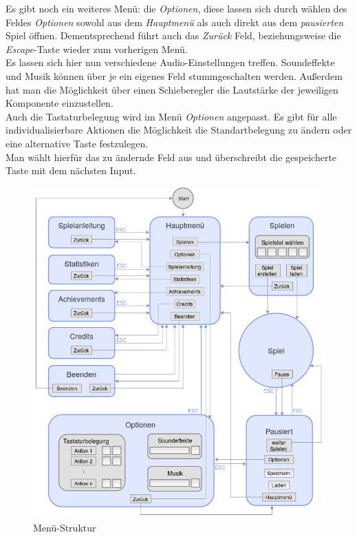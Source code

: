 Es gibt noch ein weiteres Menü: die \textit{Optionen}, diese lassen sich durch wählen des Feldes \textit{Optionen} sowohl aus dem \textit{Hauptmenü} als auch direkt aus dem \textit{pausierten} Spiel öffnen. Dementsprechend führt auch das \textit{Zurück} Feld, beziehungsweise die \textit{Escape}-Taste wieder zum vorherigen Menü.\\
Es lassen sich hier nun verschiedene Audio-Einstellungen treffen. Soundeffekte und Musik können über je ein eigenes Feld stummgeschalten werden. Außerdem hat man die Möglichkeit über einen Schieberegler die Lautstärke der jeweiligen Komponente einzustellen.\\
Auch die Tastaturbelegung wird im Menü \textit{Optionen} angepasst. Es gibt für alle individualisierbare Aktionen die Möglichkeit die Standartbelegung zu ändern oder eine alternative Taste festzulegen.\\
Man wählt hierfür das zu ändernde Feld aus und überschreibt die gespeicherte Taste mit dem nächsten Input.

\begin{figure}[ht]
	\centering
	\includegraphics[width=1\textwidth]{menu_structure.png}
	\caption{Menü-Struktur}
	\label{fig:menu}
\end{figure}


